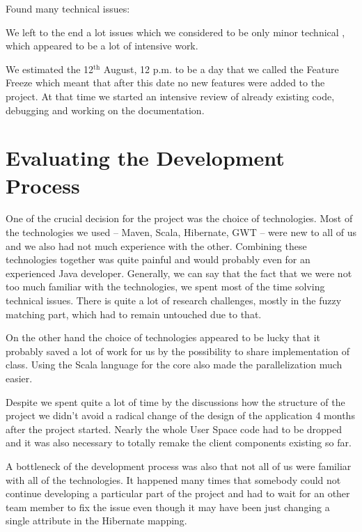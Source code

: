 Found many technical issues: %


We left to the end a lot issues which we considered to be only minor technical , which appeared to be a lot of intensive work.

We estimated the 12$^\mathrm{th}$ August, 12 p.m. to be a day that we called the Feature Freeze which meant that after this date no new features were added to the project. At that time we started an intensive review of already existing code, debugging and working on the documentation. 

\section{Evaluating the Development Process}

One of the crucial decision for the project was the choice of technologies. Most of the technologies we used -- Maven, Scala, Hibernate, GWT -- were new to all of us and we also had not much experience with the other. Combining these technologies together was quite painful and would probably even for an experienced Java developer. Generally, we can say that the fact that we were not too much familiar with the technologies, we spent most of the time solving technical issues. There is quite a lot of research challenges, mostly in the fuzzy matching part, which had to remain untouched due to that.

On the other hand the choice of technologies appeared to be lucky that it probably saved a lot of work for us by the possibility to share implementation of class. Using the Scala language for the core also made the parallelization much easier.

Despite we spent quite a lot of time by the discussions how the structure of the project we didn't avoid a radical change of the design of the application 4 months after the project started. Nearly the whole User Space code had to be dropped and it was also necessary to totally remake the client components existing so far.

A bottleneck of the development process was also that not all of us were familiar with all of the technologies. It happened many times that somebody could not continue developing a particular part of the project and had to wait for an other team member to fix the issue even though it may have been just changing a single attribute in the Hibernate mapping.

